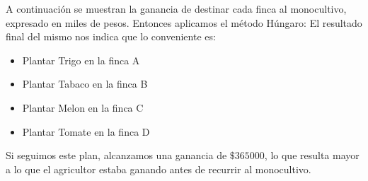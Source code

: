 
\begin{homeworkProblem}[-1][Agricultor]
A continuación se muestran la ganancia de destinar cada finca al monocultivo, expresado en miles de pesos.
Entonces aplicamos el método Húngaro:
El resultado final del mismo nos indica que lo conveniente es:
\begin{itemize}
    \item Plantar Trigo en la finca A
    \item Plantar Tabaco en la finca B
    \item Plantar Melon en la finca C
    \item Plantar Tomate en la finca D
\end{itemize}
Si seguimos este plan, alcanzamos una ganancia de $\$365000$, lo que resulta mayor a lo que el agricultor estaba ganando antes de recurrir al monocultivo.
\end{homeworkProblem}


